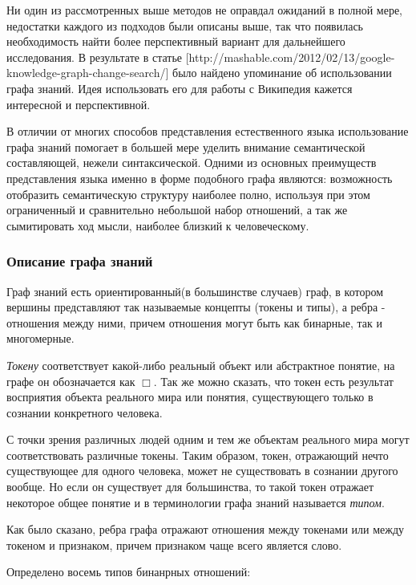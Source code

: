 Ни один из рассмотренных выше методов не оправдал ожиданий в полной мере, недостатки каждого из
подходов были описаны выше, так что появилась необходимость найти более перспективный вариант
для дальнейшего исследования. В результате в статье [http://mashable.com/2012/02/13/google-knowledge-graph-change-search/] %
было найдено упоминание об использовании графа знаний. Идея использовать его для работы с Википедия
кажется интересной и перспективной.

В отличии от многих способов представления естественного языка использование графа знаний помогает
в большей мере уделить внимание семантической составляющей, нежели синтаксической. Одними из основных
преимуществ представления языка именно в форме подобного графа являются: возможность отобразить семантическую
структуру наиболее полно, используя при этом ограниченный и сравнительно небольшой набор отношений, а так же
сымитировать ход мысли, наиболее близкий к человеческому.
\subsubsection {Описание графа знаний}
Граф знаний есть ориентированный(в большинстве случаев) граф, в котором вершины представляют так называемые концепты (токены и типы),
а ребра - отношения между ними, причем отношения могут быть как бинарные, так и многомерные. 

\textsl{Токену} соответствует какой-либо реальный объект или абстрактное понятие, на графе он обозначается
как $\Box$. Так же можно сказать, что токен есть результат восприятия объекта реального мира
или понятия, существующего только в сознании конкретного человека.

С точки зрения различных людей одним и тем же объектам реального мира могут соответствовать различные токены.
Таким образом, токен, отражающий нечто существующее для одного человека, может не существовать в сознании другого
вообще. Но если он существует для большинства, то такой токен отражает некоторое общее понятие и в терминологии
графа знаний называется \textsl{типом}.


Как было сказано, ребра графа отражают отношения между токенами или между токеном и признаком, причем
признаком чаще всего является слово. 

Определено восемь типов бинанрных отношений:


